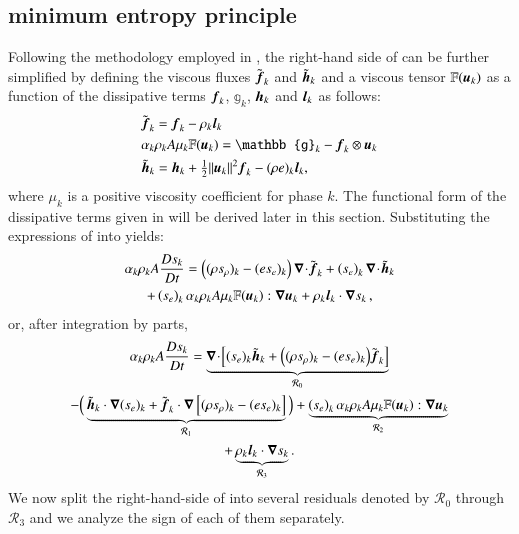 \documentclass[preprint,10pt]{elsarticle}
\begin{document}
\subsection{minimum entropy principle}\label{sct:end-min-pr}
%
Following the methodology employed in \cite{jlg, Marco_paper_low_mach}, the right-hand side of 
 can be further simplified by defining the viscous fluxes $\tilde{\boldsymbol f}_k$ and 
$\tilde{\boldsymbol h}_k$ and a viscous tensor $\mathbb{F}(\boldsymbol u_k)$ as a function of the dissipative terms $\boldsymbol f_k$, $\mathbb{g}_k$, $\boldsymbol h_k$ and $\boldsymbol l_k$ as follows:
%
\begin{subequations}\label{eq:def-diss-terms-sect4}
\begin{align}
& \tilde{\mbold f}_k   =   \mbold f_k - \rho_k \mbold  l_k
  \\
&  \alpha_k \rho_k A \mu_k \mathbb{F}(\mbold u_k) =  \mathbb{g}_k -  \mbold f_k \otimes \mbold u_k
  \\
&  \tilde{\mbold h}_k =   \mbold h_k + \tfrac{1}{2}\| \mbold u_k\|^2  \mbold f_k - (\rho e)_k \mbold l_k,
\end{align}
\end{subequations}
%
where $\mu_k$ is a positive viscosity coefficient for phase $k$. The functional form of the dissipative terms given in 
 will be derived later in this section. Substituting the expressions of  
into  yields:
%
\begin{multline}\label{eq:ent-res-7-eqn-diss-terms_rearranged2}
\alpha_k \rho_k A \frac{Ds_k}{Dt} 
=  \left( (\rho s_\rho)_k - (e s_e)_k \right) \boldsymbol\nabla\! \cdot \! \tilde{\boldsymbol f}_k 
+ \left(s_e\right)_k \boldsymbol\nabla\! \cdot \! \tilde{ \boldsymbol h} _k \\
+ \left(s_e\right)_k \alpha_k \rho_k A \mu_k \mathbb{F}(\boldsymbol u_k) : \boldsymbol\nabla \boldsymbol u_k 
+ \rho_k \boldsymbol l _k \cdot \boldsymbol\nabla s_k \,,
\end{multline}
%
or, after integration by parts,
%
\begin{multline}\label{eq:ent-res-7-eqn-diss-terms2}
\alpha_k \rho_k A \frac{Ds_k}{Dt} = 
\underbrace{\boldsymbol\nabla\! \cdot \! \left[ (s_e)_k\tilde{\boldsymbol h}_k +\Big( (\rho s_\rho)_k - (e s_e)_k \Big) \tilde{\boldsymbol f}_k \right]}_{{\mathcal{R}_0}} \\
-\Big(
\underbrace{\tilde{\boldsymbol h}_k \cdot \boldsymbol\nabla (s_e)_k + \tilde{\boldsymbol f}_k \cdot \boldsymbol\nabla \left[  (\rho s_\rho)_k - (e s_e)_k \right]}_{\mathcal{R}_1} 
\Big)
+ \underbrace{ \left(s_e\right)_k \alpha_k \rho_k A \mu_k \mathbb{F}(\boldsymbol u_k) : \boldsymbol\nabla \boldsymbol u_k}_{\mathcal{R}_2} \\
+ \underbrace{\rho_k \boldsymbol l _k \cdot \boldsymbol\nabla s_k}_{\mathcal{R}_3}.
\end{multline}
%
We now split the right-hand-side of  into several residuals denoted by $\mathcal{R}_0$ 
through $\mathcal{R}_3$ and we analyze the sign of each of them separately. 
\end{document}
